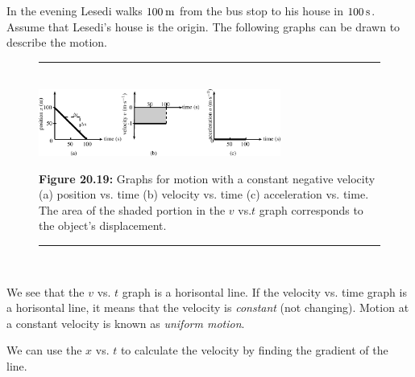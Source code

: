         \label{m38795*id70200}In the evening Lesedi walks $100\phantom{\rule{2pt}{0ex}}\mathrm{m}$ from the bus stop to his house in $100\phantom{\rule{2pt}{0ex}}\mathrm{s}$. Assume that Lesedi's house is the origin. The following graphs can be drawn to describe the motion.\par 
    \setcounter{subfigure}{0}
	\begin{figure}[H] %
    \begin{center}
    \rule[.1in]{\figurerulewidth}{.005in} \\
        \label{m38795*uid93!!!underscore!!!media}\label{m38795*uid93!!!underscore!!!printimage}\includegraphics[width=300px]{col11305.imgs/m38795_PG10C2_024.png} %
      \vspace{2pt}
    \vspace{\rubberspace}\par \begin{cnxcaption}
	  \small \textbf{Figure 20.19: }Graphs for motion with a constant negative velocity (a) position vs. time (b) velocity vs. time (c) acceleration vs. time. The area of the shaded portion in the $v$ vs.$t$ graph corresponds to the object's displacement.
	\end{cnxcaption}
    \vspace{.1in}
    \rule[.1in]{\figurerulewidth}{.005in} \\
    \end{center}
 \end{figure}       
        \label{m38795*id70236}We see that the $v$ vs. $t$ graph is a horisontal line. If the velocity vs. time graph is a horisontal line, it means that the velocity is \textsl{constant} (not changing). Motion at a constant velocity is known as \textsl{uniform motion}.\par 
        \label{m38795*id70269}We can use the $x$ vs. $t$ to calculate the velocity by finding the gradient of the line.\par 
        \label{m38795*id70291}\nopagebreak\noindent{}
          
